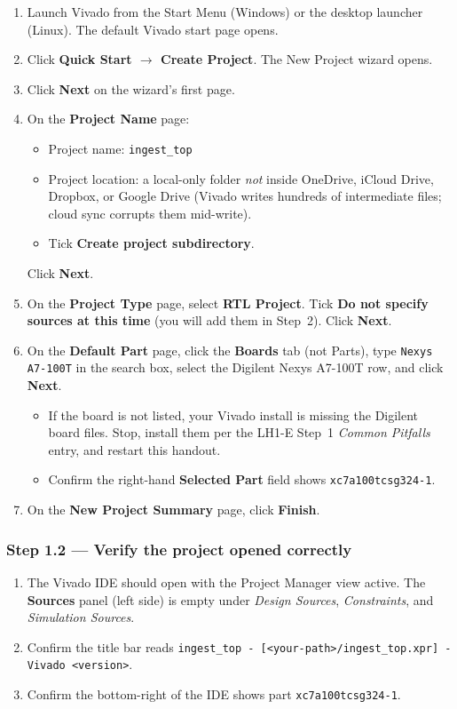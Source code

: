 \documentclass[11pt,letterpaper]{article}
\begin{document}
\begin{enumerate}[leftmargin=2em]
	\item Launch Vivado from the Start Menu (Windows) or the desktop launcher (Linux). The default Vivado start page opens.
	\item Click \textbf{Quick Start $\to$ Create Project}. The New Project wizard opens.
	\item Click \textbf{Next} on the wizard's first page.
	\item On the \textbf{Project Name} page:
	\begin{itemize}[leftmargin=1.2em, topsep=2pt, itemsep=2pt]
		\item Project name: \texttt{ingest\_top}
		\item Project location: a local-only folder \emph{not} inside OneDrive, iCloud Drive, Dropbox, or Google Drive (Vivado writes hundreds of intermediate files; cloud sync corrupts them mid-write).
		\item Tick \textbf{Create project subdirectory}.
	\end{itemize}
	Click \textbf{Next}.
	\item On the \textbf{Project Type} page, select \textbf{RTL Project}. Tick \textbf{Do not specify sources at this time} (you will add them in Step~2). Click \textbf{Next}.
	\item On the \textbf{Default Part} page, click the \textbf{Boards} tab (not Parts), type \texttt{Nexys A7-100T} in the search box, select the Digilent Nexys A7-100T row, and click \textbf{Next}.
	\begin{itemize}[leftmargin=1.2em, topsep=2pt, itemsep=2pt]
		\item If the board is not listed, your Vivado install is missing the Digilent board files. Stop, install them per the LH1-E Step~1 \textit{Common Pitfalls} entry, and restart this handout.
		\item Confirm the right-hand \textbf{Selected Part} field shows \texttt{xc7a100tcsg324-1}.
	\end{itemize}
	\item On the \textbf{New Project Summary} page, click \textbf{Finish}.
\end{enumerate}

\subsubsection*{Step 1.2 --- Verify the project opened correctly}

\begin{enumerate}[leftmargin=2em]
	\item The Vivado IDE should open with the Project Manager view active. The \textbf{Sources} panel (left side) is empty under \textit{Design Sources}, \textit{Constraints}, and \textit{Simulation Sources}.
	\item Confirm the title bar reads \texttt{ingest\_top - [<your-path>/ingest\_top.xpr] - Vivado <version>}.
	\item Confirm the bottom-right of the IDE shows part \texttt{xc7a100tcsg324-1}.
\end{enumerate}
\end{document}
